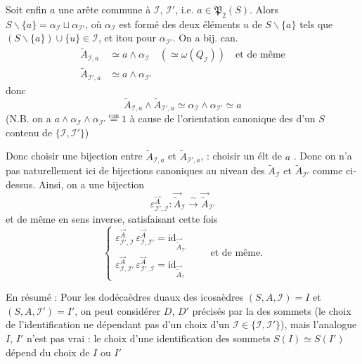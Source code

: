 \documentclass[11pt,a4paper]{article}
\begin{document}
Soit enfin $a$ une arête commune à $\mathcal I$, $\mathcal I'$, i.e. $a\in\mathfrak P_2(S)$. Alors $S\smallsetminus\{a\} = \alpha_{\mathcal I}\sqcup\alpha_{\mathcal I'}$, où $\alpha_{\mathcal I}$ est formé des deux éléments \struck{\ill{}} $u$ de $S\smallsetminus\{a\}$ tels que $(S\smallsetminus\{a\})\cup\{u\}\in\mathcal I$, et itou pour $\alpha_{\mathcal I'}$. On a bij. can.
\[
\begin{aligned}
\widetilde A_{\mathcal I,a} &\simeq a\wedge\alpha_{\mathcal I} \quad (\simeq\omega(Q_{\mathcal I})) \quad\text{et de même}\\
\widetilde A_{\mathcal I',a} &\simeq a\wedge\alpha_{\mathcal I'}
\end{aligned}
\]
donc
\[
\widetilde A_{\mathcal I,a}\wedge\widetilde A_{\mathcal I',a} \simeq \alpha_{\mathcal I}\wedge\alpha_{\mathcal I'} \simeq a
\]
(N.B. on a $a\wedge\alpha_{\mathcal I}\wedge\alpha_{\mathcal I'} \overset{\text{can}}{=} 1$ à cause de l'orientation canonique des \ill{} d'un $S$ contenu de $\{\mathcal I,\mathcal I'\}$)

Donc choisir une bijection entre $\widetilde A_{\mathcal I,a}$ et $\widetilde A_{\mathcal I',a}$,  : choisir un élt de $a$ . Donc on n'a pas naturellement ici de bijections canoniques au niveau des $\widetilde A_{\mathcal I}$ et $\widetilde A_{\mathcal I'}$ comme ci-dessus. Ainsi, on a une bijection
\[
\varepsilon^{\vec A}_{\mathcal I',\mathcal I} : \vec{\widetilde A}_{\mathcal I} \xrightarrow{\ \sim\ } \vec{\widetilde A}_{\mathcal I'}
\]
et de même en sens inverse, satisfaisant cette fois
\[
\begin{cases}
\varepsilon^{\vec A}_{\mathcal I',\mathcal I}\,\varepsilon^{\vec A}_{\mathcal I,\mathcal I'} = \mathrm{id}_{\vec{\widetilde A}_{\mathcal I'}}\\
\varepsilon^{\vec A}_{\mathcal I,\mathcal I'}\,\varepsilon^{\vec A}_{\mathcal I',\mathcal I} = \mathrm{id}_{\vec{\widetilde A}_{\mathcal I}}
\end{cases}
\qquad\text{et de même.}
\]

En résumé : Pour les dodécaèdres   duaux des icosaèdres $(S,A,\mathcal I) = I$ et $(S,A,\mathcal I') = I'$,  on peut considérer $D$, $D'$ précisés par la \ill{} \ill{} des sommets (le choix de l'identification ne dépendant pas d'un choix d'un $\mathcal I\in\{\mathcal I,\mathcal I'\}$), mais l'analogue   $I$, $I'$ n'est pas vrai : le choix d'une identification des sommets $S(I)\simeq S(I')$ dépend du choix de $I$ ou $I'$
\end{document}

